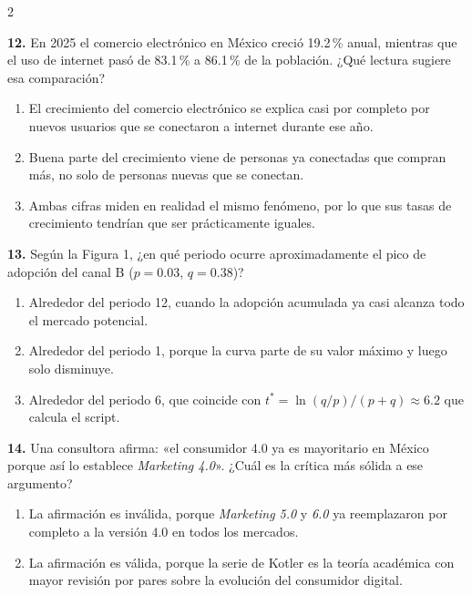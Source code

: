 \documentclass[10pt,letterpaper]{article}
\begin{document}
\begin{multicols}{2}
\begin{enumerate}[label=\alph*),leftmargin=1.1em,itemsep=0pt,topsep=1pt,parsep=0pt,partopsep=0pt]
\end{enumerate}
\vspace{2pt}
\noindent\textbf{12.} En 2025 el comercio electrónico en México creció 19.2\,\% anual, mientras que el uso de internet pasó de 83.1\,\% a 86.1\,\% de la población. ¿Qué lectura sugiere esa comparación?
\vspace{-3pt}
\begin{enumerate}[label=\alph*),leftmargin=1.1em,itemsep=0pt,topsep=1pt,parsep=0pt,partopsep=0pt]
\item El crecimiento del comercio electrónico se explica casi por completo por nuevos usuarios que se conectaron a internet durante ese año.
\item Buena parte del crecimiento viene de personas ya conectadas que compran más, no solo de personas nuevas que se conectan.
\item Ambas cifras miden en realidad el mismo fenómeno, por lo que sus tasas de crecimiento tendrían que ser prácticamente iguales.
\end{enumerate}
\vspace{2pt}
\noindent\textbf{13.} Según la Figura 1, ¿en qué periodo ocurre aproximadamente el pico de adopción del canal B ($p=0.03$, $q=0.38$)?
\vspace{-3pt}
\begin{enumerate}[label=\alph*),leftmargin=1.1em,itemsep=0pt,topsep=1pt,parsep=0pt,partopsep=0pt]
\item Alrededor del periodo 12, cuando la adopción acumulada ya casi alcanza todo el mercado potencial.
\item Alrededor del periodo 1, porque la curva parte de su valor máximo y luego solo disminuye.
\item Alrededor del periodo 6, que coincide con $t^\ast=\ln(q/p)/(p+q)\approx 6.2$ que calcula el script.
\end{enumerate}
\vspace{2pt}
\noindent\textbf{14.} Una consultora afirma: «el consumidor 4.0 ya es mayoritario en México porque así lo establece \textit{Marketing 4.0}». ¿Cuál es la crítica más sólida a ese argumento?
\vspace{-3pt}
\begin{enumerate}[label=\alph*),leftmargin=1.1em,itemsep=0pt,topsep=1pt,parsep=0pt,partopsep=0pt]
\item La afirmación es inválida, porque \textit{Marketing 5.0} y \textit{6.0} ya reemplazaron por completo a la versión 4.0 en todos los mercados.
\item La afirmación es válida, porque la serie de Kotler es la teoría académica con mayor revisión por pares sobre la evolución del consumidor digital.

\end{enumerate}
\end{multicols}
\end{document}
